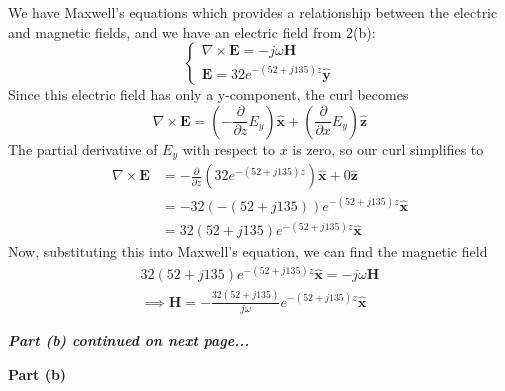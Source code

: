 \documentclass[11pt]{article}
\begin{document}
\begin{homeworkProblem}
We have Maxwell's equations which provides a relationship between the electric and magnetic fields, and we have an electric field from 2(b): 
\[\begin{cases}
    \nabla \times \mathbf{E} = -j \omega \mathbf{H} \\
    \mathbf{E} = 32 e^{-(52 + j 135) z} \hat{\mathbf{y}}
\end{cases}\]
Since this electric field has only a y-component, the curl becomes
\[
    \nabla\times\mathbf{E} = \left(-\frac{\partial}{\partial z} E_y\right)\hat{\mathbf{x}} + \left(\frac{\partial}{\partial x} E_y\right) \hat{\mathbf{z}}
\]
The partial derivative of $E_y$ with respect to $x$ is zero, so our curl simplifies to
\begin{align*}
    \nabla\times\mathbf{E} &= -\frac{\partial}{\partial z} \left(32 e^{-(52 + j 135) z}\right) \hat{\mathbf{x}} + 0 \hat{\mathbf{z}} \\
    &= -32 (-(52 + j 135)) e^{-(52 + j 135) z} \hat{\mathbf{x}} \\
    &= 32 (52 + j 135) e^{-(52 + j 135) z} \hat{\mathbf{x}}
\end{align*}
Now, substituting this into Maxwell's equation, we can find the magnetic field
\begin{align*}
    32 (52 + j 135) e^{-(52 + j 135) z} \hat{\mathbf{x}} = -j \omega \mathbf{H} \\
    \implies \mathbf{H} = -\frac{32 (52 + j 135)}{j \omega} e^{-(52 + j 135) z} \hat{\mathbf{x}}
\end{align*}
\vspace{1\baselineskip}

\textbf{\textit{Part (b) continued on next page...}}

\pagebreak

\textbf{Part (b)} \vspace{1\baselineskip}


\end{homeworkProblem}
\end{document}
